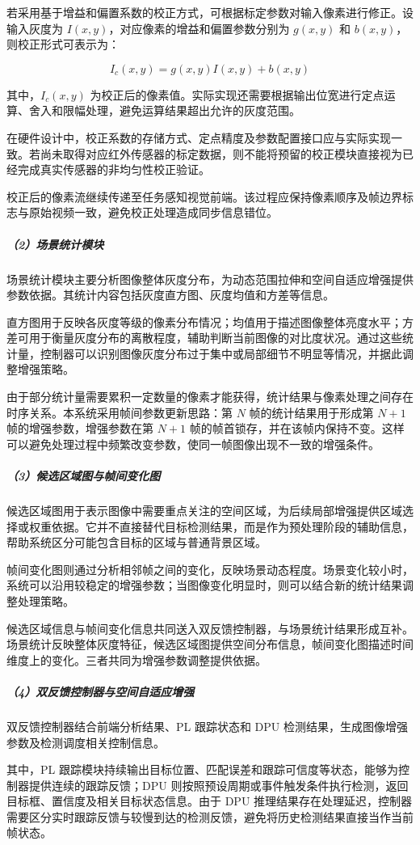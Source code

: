 \documentclass[UTF8,a4paper,12pt,fontset=windows]{ctexart}
\begin{document}
若采用基于增益和偏置系数的校正方式，可根据标定参数对输入像素进行修正。设输入灰度为 \(I(x,y)\)，对应像素的增益和偏置参数分别为 \(g(x,y)\) 和 \(b(x,y)\)，则校正形式可表示为：

\[
I_c(x,y)=g(x,y)I(x,y)+b(x,y)
\]

其中，\(I_c(x,y)\) 为校正后的像素值。实际实现还需要根据输出位宽进行定点运算、舍入和限幅处理，避免运算结果超出允许的灰度范围。

在硬件设计中，校正系数的存储方式、定点精度及参数配置接口应与实际实现一致。若尚未取得对应红外传感器的标定数据，则不能将预留的校正模块直接视为已经完成真实传感器的非均匀性校正验证。

校正后的像素流继续传递至任务感知视觉前端。该过程应保持像素顺序及帧边界标志与原始视频一致，避免校正处理造成同步信息错位。

\subparagraph*{（2）场景统计模块}
场景统计模块主要分析图像整体灰度分布，为动态范围拉伸和空间自适应增强提供参数依据。其统计内容包括灰度直方图、灰度均值和方差等信息。

直方图用于反映各灰度等级的像素分布情况；均值用于描述图像整体亮度水平；方差可用于衡量灰度分布的离散程度，辅助判断当前图像的对比度状况。通过这些统计量，控制器可以识别图像灰度分布过于集中或局部细节不明显等情况，并据此调整增强策略。

由于部分统计量需要累积一定数量的像素才能获得，统计结果与像素处理之间存在时序关系。本系统采用帧间参数更新思路：第 \(N\) 帧的统计结果用于形成第 \(N+1\) 帧的增强参数，增强参数在第 \(N+1\) 帧的帧首锁存，并在该帧内保持不变。这样可以避免处理过程中频繁改变参数，使同一帧图像出现不一致的增强条件。

\subparagraph*{（3）候选区域图与帧间变化图}
候选区域图用于表示图像中需要重点关注的空间区域，为后续局部增强提供区域选择或权重依据。它并不直接替代目标检测结果，而是作为预处理阶段的辅助信息，帮助系统区分可能包含目标的区域与普通背景区域。

帧间变化图则通过分析相邻帧之间的变化，反映场景动态程度。场景变化较小时，系统可以沿用较稳定的增强参数；当图像变化明显时，则可以结合新的统计结果调整处理策略。

候选区域信息与帧间变化信息共同送入双反馈控制器，与场景统计结果形成互补。场景统计反映整体灰度特征，候选区域图提供空间分布信息，帧间变化图描述时间维度上的变化。三者共同为增强参数调整提供依据。

\subparagraph*{（4）双反馈控制器与空间自适应增强}
双反馈控制器结合前端分析结果、PL 跟踪状态和 DPU 检测结果，生成图像增强参数及检测调度相关控制信息。

其中，PL 跟踪模块持续输出目标位置、匹配误差和跟踪可信度等状态，能够为控制器提供连续的跟踪反馈；DPU 则按照预设周期或事件触发条件执行检测，返回目标框、置信度及相关目标状态信息。由于 DPU 推理结果存在处理延迟，控制器需要区分实时跟踪反馈与较慢到达的检测反馈，避免将历史检测结果直接当作当前帧状态。
\end{document}
